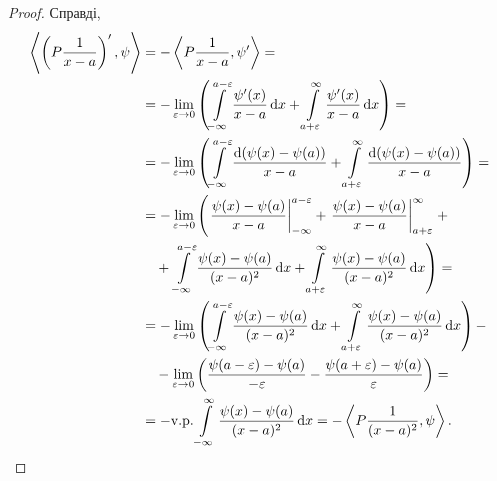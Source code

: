 \begin{proof}
	Справді,
	\begin{equation}
		\begin{aligned}
			\left\langle \left( P \frac{1}{x - a} \right)', \psi \right\rangle &= - \left\langle P \frac{1}{x - a}, \psi' \right\rangle = \\
			&= - \Lim_{\epsilon \to 0} \left( \Int_{-\infty}^{a - \epsilon}\frac{\psi'(x)}{x - a} \diff x + \Int_{a + \epsilon}^\infty \frac{\psi'(x)}{x - a} \diff x \right) = \\
			&= - \Lim_{\epsilon \to 0} \left( \Int_{-\infty}^{a - \epsilon}\frac{\diff (\psi(x) - \psi(a))}{x - a} + \Int_{a + \epsilon}^\infty \frac{\diff (\psi(x) - \psi(a))}{x - a} \right) = \\
			&= - \Lim_{\epsilon \to 0} \left( \left. \frac{\psi(x) - \psi(a)}{x - a} \right|_{-\infty}^{a - \epsilon} + \left. \frac{\psi(x) - \psi(a)}{x - a}\right|_{a + \epsilon}^\infty \right. + \\
			&\quad + \left. \Int_{-\infty}^{a - \epsilon}\frac{\psi(x) - \psi(a)}{(x - a)^2} \diff x + \Int_{a + \epsilon}^\infty \frac{\psi(x) - \psi(a)}{(x - a)^2} \diff x \right) = \\
			&= - \Lim_{\epsilon \to 0} \left( \Int_{-\infty}^{a - \epsilon}\frac{\psi(x) - \psi(a)}{(x - a)^2} \diff x + \Int_{a + \epsilon}^\infty \frac{\psi(x) - \psi(a)}{(x - a)^2} \diff x \right) - \\
			&\quad-\Lim_{\epsilon \to 0} \left( \frac{\psi(a - \epsilon) - \psi(a)}{-\epsilon} - \frac{\psi(a + \epsilon) - \psi(a)}{\epsilon} \right) = \\
			&= -\text{v.p.} \Int_{-\infty}^\infty \frac{\psi(x) - \psi(a)}{(x - a)^2} \diff x = - \left\langle P \frac{1}{(x - a)^2}, \psi \right\rangle.
		\end{aligned}
	\end{equation}
\end{proof}

